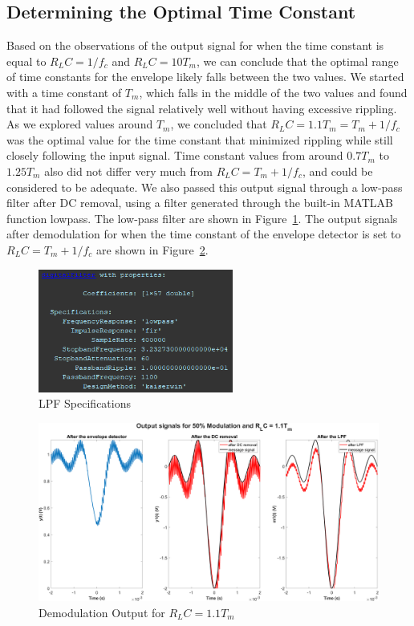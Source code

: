 \documentclass[12pt]{article}
\begin{document}
\subsection*{Determining the Optimal Time Constant}
Based on the observations of the output signal for when the time constant is equal to $R_LC = 1/f_c$ and $R_LC = 10T_m$, we can conclude that the optimal range of time constants for the envelope likely falls between the two values. We started with a time constant of $T_m$, which falls in the middle of the two values and found that it had followed the signal relatively well without having excessive rippling. As we explored values around $T_m$, we concluded that $R_LC = 1.1T_m = T_m + 1/f_c$ was the optimal value for the time constant that minimized rippling while still closely following the input signal. Time constant values from around $0.7T_m$ to $1.25T_m$ also did not differ very much from $R_LC = T_m + 1/f_c$, and could be considered to be adequate. We also passed this output signal through a low-pass filter after DC removal, using a filter generated through the built-in MATLAB function lowpass. The low-pass filter are shown in Figure~\ref{fig:lpf}. The output signals after demodulation for when the time constant of the envelope detector is set to $R_LC = T_m + 1/f_c$ are shown in Figure~\ref{fig:q2iii}.
\begin{figure}[h!]
    \centering
    \includegraphics[width=0.57\textwidth]{lpf}
    \caption{\label{fig:lpf}LPF Specifications}
\end{figure}
\begin{figure}[h!]
    \centering
    \includegraphics[width=\textwidth]{q2iii}
    \caption{\label{fig:q2iii}Demodulation Output for $R_LC = 1.1T_m$}
\end{figure}
\end{document}
